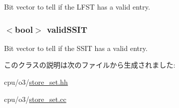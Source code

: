 \label{classStoreSet_aa0bec890135b0b249993f12f80634c07}
Bit vector to tell if the LFST has a valid entry. \hypertarget{classStoreSet_ae026c336a6a2761ace6e098304dda75f}{
\subsubsection[{validSSIT}]{$<$bool$>$ {\bf validSSIT}}}
\label{classStoreSet_ae026c336a6a2761ace6e098304dda75f}
Bit vector to tell if the SSIT has a valid entry. 

このクラスの説明は次のファイルから生成されました:\begin{DoxyCompactItemize}
\item 
cpu/o3/\hyperlink{store__set_8hh}{store\_\-set.hh}\item 
cpu/o3/\hyperlink{store__set_8cc}{store\_\-set.cc}\end{DoxyCompactItemize}

